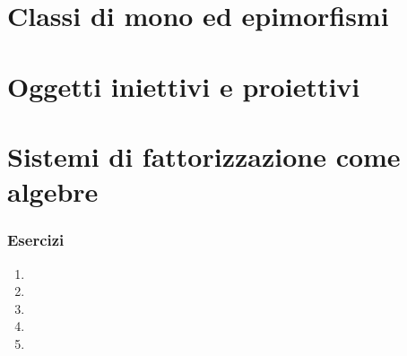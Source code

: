 \section[Mono ed epimorfismi]{Classi di mono ed epimorfismi}
\section[Iniettivi e proiettivi]{Oggetti iniettivi e proiettivi}
\section[Fattorizzazione e algebre]{Sistemi di fattorizzazione come algebre}
\subsubsection*{Esercizi}
\begin{enumerate}
    \item 
    \item 
    \item 
    \item 
    \item 
\end{enumerate}
